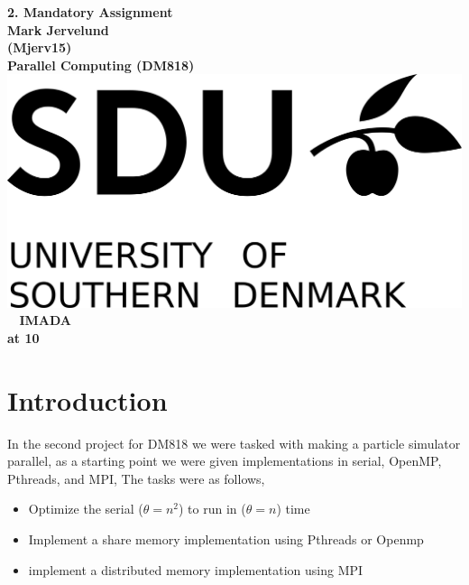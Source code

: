 \documentclass[a4paper,10pt,titlepage]{report}
\date{}
\begin{document}
\begin{titlepage}
\centering
    \vspace*{9\baselineskip}
    \huge
    \bfseries
    2. Mandatory Assignment \\
    \normalfont
    Mark Jervelund  \\
    (Mjerv15) \\
	\huge
    Parallel Computing (DM818)  \\[4\baselineskip]
    \normalfont
	\includegraphics[scale=1]{SDU_logo}
    \vfill\
    \vspace{5mm}
    IMADA \\

    \textbf{\datedate}  \bf{at 10} \\[2\baselineskip]
\end{titlepage}

\renewcommand{\thepage}{\roman{page}}%
\tableofcontents
\newpage
\setcounter{page}{1}
\renewcommand{\thepage}{\arabic{page}}


\section{Introduction}

In the second project for DM818 we were tasked with making a particle simulator parallel, as a starting point we were given implementations in serial, OpenMP, Pthreads, and MPI, The tasks were as follows, \\

\begin{itemize}
\item Optimize the serial ($ \theta = n^2$) to run in ($ \theta = n$) time
\item Implement a share memory implementation using Pthreads or Openmp
\item implement a distributed memory implementation using MPI
\end{itemize}
\end{document}
